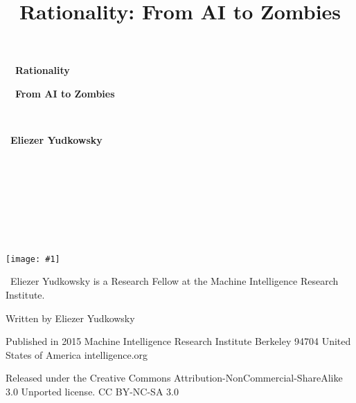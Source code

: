 \documentclass[letterpaper]{book}
\title{Rationality: From AI to Zombies}
\author{}
\date{}
\newcommand{\mygraphics}[1]{
  \texttt{[image: \#1]}
}
\begin{document}
{
  }


\bigskip

\clearpage
\bigskip

{\centering
\ \ \textbf{Rationality}
\par}


\bigskip

{\centering
\ \ \textbf{From AI to Zombies}
\par}

{\centering
 ~
\par}

{\centering
\ \textbf{Eliezer Yudkowsky}
\par}

\paragraph[]{\rmfamily }
{\centering
 ~
\par}

{\centering
 ~
\par}

{\centering
 ~
\par}

{\centering
 ~
\par}

\mygraphics{images/img2.jpg}


\bigskip

{\centering
 \ Eliezer Yudkowsky is a Research Fellow at the Machine
Intelligence Research Institute.
\par}


\bigskip

{\centering
 Written by Eliezer Yudkowsky
\par}


\bigskip

{\centering
 Published in 2015\newline
 Machine Intelligence Research Institute\newline
 Berkeley 94704\newline
 United States of America\newline
 intelligence.org\newline

\par}

{\centering
 Released under the Creative Commons
Attribution-NonCommercial-ShareAlike 3.0 Unported license.\newline
 CC BY-NC-SA 3.0
\par}
\end{document}
